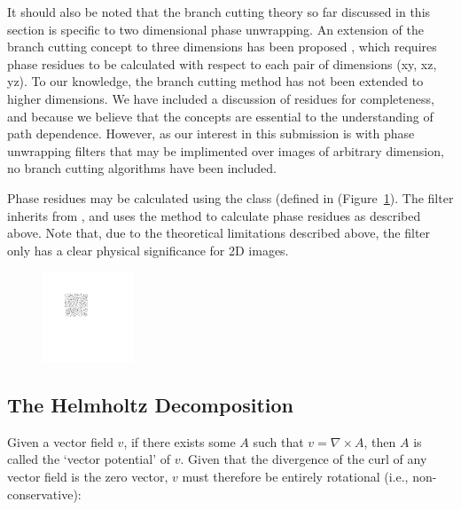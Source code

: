 It should also be noted that the branch cutting theory so far discussed in this section is specific to two dimensional phase unwrapping.  An extension of the branch cutting concept to three dimensions has been proposed \cite{Huntley2001}, which requires phase residues to be calculated with respect to each pair of dimensions (xy, xz, yz).  To our knowledge, the branch cutting method has not been extended to higher dimensions.  We have included a discussion of residues for completeness, and because we believe that the concepts are essential to the understanding of path dependence.  However, as our interest in this submission is with phase unwrapping filters that may be implimented over images of arbitrary dimension, no branch cutting algorithms have been included.

Phase residues may be calculated using the  class (defined in  (Figure~\ref{fig:Phase_Residues_Noise_Patch}).  The filter inherits from , and uses the  method to calculate phase residues as described above.  Note that, due to the theoretical limitations described above, the filter only has a clear physical significance for 2D images.

\begin{figure}[h]
\center
\includegraphics[width=0.24\textwidth]{images/3/02a_residue.png}

\label{fig:Phase_Residues_Noise_Patch}
\end{figure}

\subsection{The Helmholtz Decomposition}

Given a vector field $v$, if there exists some $A$ such that $v = \nabla \times A$, then $A$ is called the `vector potential' of $v$.  Given that the divergence of the curl of any vector field is the zero vector, $v$ must therefore be entirely rotational (i.e., non-conservative):

